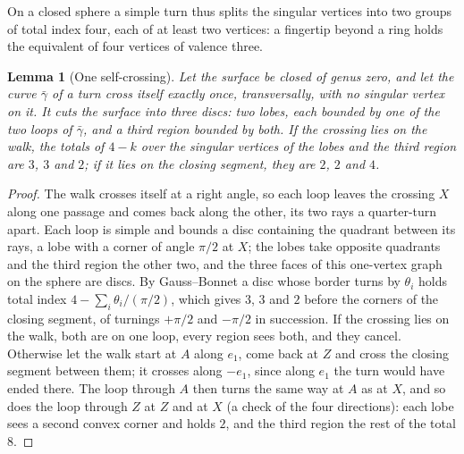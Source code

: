 \documentclass[11pt,a4paper]{article}
\newtheorem{lemma}{Lemma}
\begin{document}
On a closed sphere a simple turn thus splits the singular vertices into two
groups of total index four, each of at least two vertices: a fingertip beyond
a ring holds the equivalent of four vertices of valence three.

\begin{lemma}[One self-crossing]\label{lem:eight}
Let the surface be closed of genus zero, and let the curve $\bar\gamma$ of a
turn cross itself exactly once, transversally, with no singular vertex on it.
It cuts the surface into three discs: two \emph{lobes}, each bounded by one of
the two loops of $\bar\gamma$, and a third region bounded by both. If the
crossing lies on the walk, the totals of $4 - k$ over the singular vertices of
the lobes and the third region are $3$, $3$ and $2$; if it lies on the closing
segment, they are $2$, $2$ and $4$.
\end{lemma}

\begin{proof}
The walk crosses itself at a right angle, so each loop leaves the crossing
$X$ along one passage and comes back along the other, its two rays a
quarter-turn apart. Each loop is simple and bounds a disc containing the
quadrant between its rays, a lobe with a corner of angle $\pi/2$ at $X$; the
lobes take opposite quadrants and the third region the other two, and the
three faces of this one-vertex graph on the sphere are discs. By
Gauss--Bonnet a disc whose border turns by $\theta_i$ holds total index $4 -
\sum_i \theta_i/(\pi/2)$, which gives $3$, $3$ and $2$ before the corners of
the closing segment, of turnings $+\pi/2$ and $-\pi/2$ in succession. If the
crossing lies on the walk, both are on one loop, every region sees both, and
they cancel. Otherwise let the walk start at $A$ along $e_1$, come back at $Z$
and cross the closing segment between them; it crosses along $-e_1$, since
along $e_1$ the turn would have ended there. The loop through $A$ then turns
the same way at $A$ as at $X$, and so does the loop through $Z$ at $Z$ and at $X$ (a
check of the four directions): each lobe sees a second convex corner and holds
$2$, and the third region the rest of the total $8$.
\end{proof}
\end{document}
